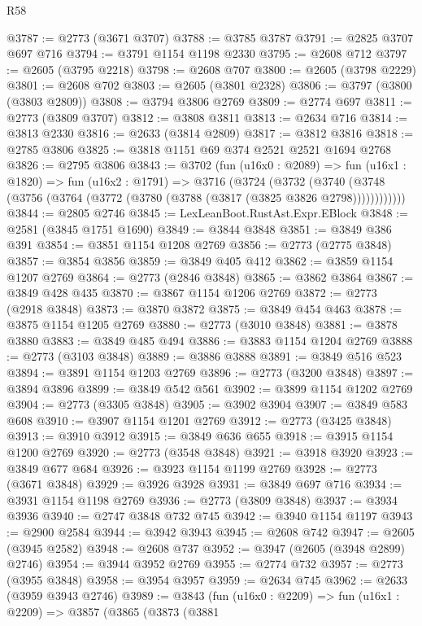 \begin{lexlean}{R58}
\begin{coremodule}
@3787 := @2773 (@3671 @3707)
@3788 := @3785 @3787
@3791 := @2825 @3707 @697 @716
@3794 := @3791 @1154 @1198 @2330
@3795 := @2608 @712
@3797 := @2605 (@3795 @2218)
@3798 := @2608 @707
@3800 := @2605 (@3798 @2229)
@3801 := @2608 @702
@3803 := @2605 (@3801 @2328)
@3806 := @3797 (@3800 (@3803 @2809))
@3808 := @3794 @3806 @2769
@3809 := @2774 @697
@3811 := @2773 (@3809 @3707)
@3812 := @3808 @3811
@3813 := @2634 @716
@3814 := @3813 @2330
@3816 := @2633 (@3814 @2809)
@3817 := @3812 @3816
@3818 := @2785 @3806
@3825 := @3818 @1151 @69 @374 @2521 @2521 @1694 @2768
@3826 := @2795 @3806
@3843 := @3702
    (fun (u16x0 : @2089) =>
    fun (u16x1 : @1820) =>
    fun (u16x2 : @1791) =>
    @3716
      (@3724
        (@3732
          (@3740 (@3748 (@3756 (@3764 (@3772 (@3780 (@3788 (@3817 (@3825 @3826 @2798))))))))))))
@3844 := @2805 @2746
@3845 := LexLeanBoot.RustAst.Expr.EBlock
@3848 := @2581 (@3845 @1751 @1690)
@3849 := @3844 @3848
@3851 := @3849 @386 @391
@3854 := @3851 @1154 @1208 @2769
@3856 := @2773 (@2775 @3848)
@3857 := @3854 @3856
@3859 := @3849 @405 @412
@3862 := @3859 @1154 @1207 @2769
@3864 := @2773 (@2846 @3848)
@3865 := @3862 @3864
@3867 := @3849 @428 @435
@3870 := @3867 @1154 @1206 @2769
@3872 := @2773 (@2918 @3848)
@3873 := @3870 @3872
@3875 := @3849 @454 @463
@3878 := @3875 @1154 @1205 @2769
@3880 := @2773 (@3010 @3848)
@3881 := @3878 @3880
@3883 := @3849 @485 @494
@3886 := @3883 @1154 @1204 @2769
@3888 := @2773 (@3103 @3848)
@3889 := @3886 @3888
@3891 := @3849 @516 @523
@3894 := @3891 @1154 @1203 @2769
@3896 := @2773 (@3200 @3848)
@3897 := @3894 @3896
@3899 := @3849 @542 @561
@3902 := @3899 @1154 @1202 @2769
@3904 := @2773 (@3305 @3848)
@3905 := @3902 @3904
@3907 := @3849 @583 @608
@3910 := @3907 @1154 @1201 @2769
@3912 := @2773 (@3425 @3848)
@3913 := @3910 @3912
@3915 := @3849 @636 @655
@3918 := @3915 @1154 @1200 @2769
@3920 := @2773 (@3548 @3848)
@3921 := @3918 @3920
@3923 := @3849 @677 @684
@3926 := @3923 @1154 @1199 @2769
@3928 := @2773 (@3671 @3848)
@3929 := @3926 @3928
@3931 := @3849 @697 @716
@3934 := @3931 @1154 @1198 @2769
@3936 := @2773 (@3809 @3848)
@3937 := @3934 @3936
@3940 := @2747 @3848 @732 @745
@3942 := @3940 @1154 @1197
@3943 := @2900 @2584
@3944 := @3942 @3943
@3945 := @2608 @742
@3947 := @2605 (@3945 @2582)
@3948 := @2608 @737
@3952 := @3947 (@2605 (@3948 @2899) @2746)
@3954 := @3944 @3952 @2769
@3955 := @2774 @732
@3957 := @2773 (@3955 @3848)
@3958 := @3954 @3957
@3959 := @2634 @745
@3962 := @2633 (@3959 @3943 @2746)
@3989 := @3843
    (fun (u16x0 : @2209) =>
    fun (u16x1 : @2209) =>
    @3857
      (@3865
        (@3873
          (@3881

\end{coremodule}
\end{lexlean}
